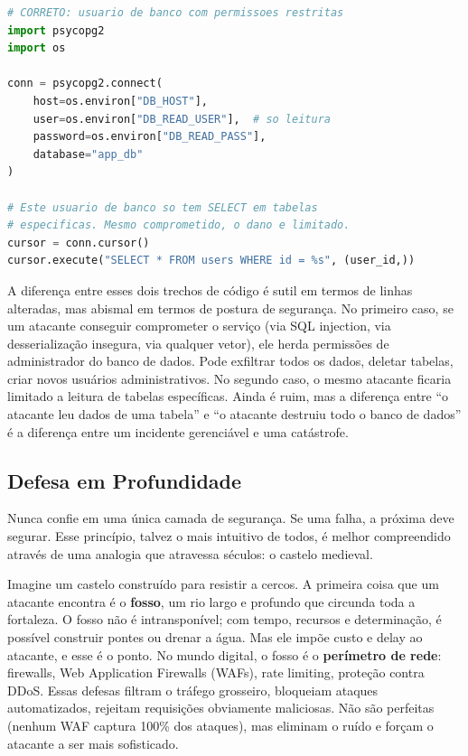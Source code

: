 \begin{lstlisting}[language=Python, caption={Menor privilégio -- exemplo correto}]
# CORRETO: usuario de banco com permissoes restritas
import psycopg2
import os

conn = psycopg2.connect(
    host=os.environ["DB_HOST"],
    user=os.environ["DB_READ_USER"],  # so leitura
    password=os.environ["DB_READ_PASS"],
    database="app_db"
)

# Este usuario de banco so tem SELECT em tabelas
# especificas. Mesmo comprometido, o dano e limitado.
cursor = conn.cursor()
cursor.execute("SELECT * FROM users WHERE id = %s", (user_id,))
\end{lstlisting}

A diferença entre esses dois trechos de código é sutil em termos de linhas
alteradas, mas abismal em termos de postura de segurança. No primeiro caso, se
um atacante conseguir comprometer o serviço (via SQL injection, via
desserialização insegura, via qualquer vetor), ele herda permissões de
administrador do banco de dados. Pode exfiltrar todos os dados, deletar tabelas,
criar novos usuários administrativos. No segundo caso, o mesmo atacante ficaria
limitado a leitura de tabelas específicas. Ainda é ruim, mas a diferença entre
``o atacante leu dados de uma tabela'' e ``o atacante destruiu todo o banco de
dados'' é a diferença entre um incidente gerenciável e uma catástrofe.

\subsection{Defesa em Profundidade}

Nunca confie em uma única camada de segurança. Se uma falha, a próxima deve
segurar. Esse princípio, talvez o mais intuitivo de todos, é melhor compreendido
através de uma analogia que atravessa séculos: o castelo medieval.

Imagine um castelo construído para resistir a cercos. A primeira coisa que um
atacante encontra é o \textbf{fosso}, um rio largo e profundo que circunda
toda a fortaleza. O fosso não é intransponível; com tempo, recursos e
determinação, é possível construir pontes ou drenar a água. Mas ele impõe custo
e delay ao atacante, e esse é o ponto. No mundo digital, o fosso é o
\textbf{perímetro de rede}: firewalls, Web Application Firewalls (WAFs), rate
limiting, proteção contra DDoS. Essas defesas filtram o tráfego grosseiro, bloqueiam
ataques automatizados, rejeitam requisições obviamente maliciosas. Não são
perfeitas (nenhum WAF captura 100\% dos ataques), mas eliminam o ruído e
forçam o atacante a ser mais sofisticado.

